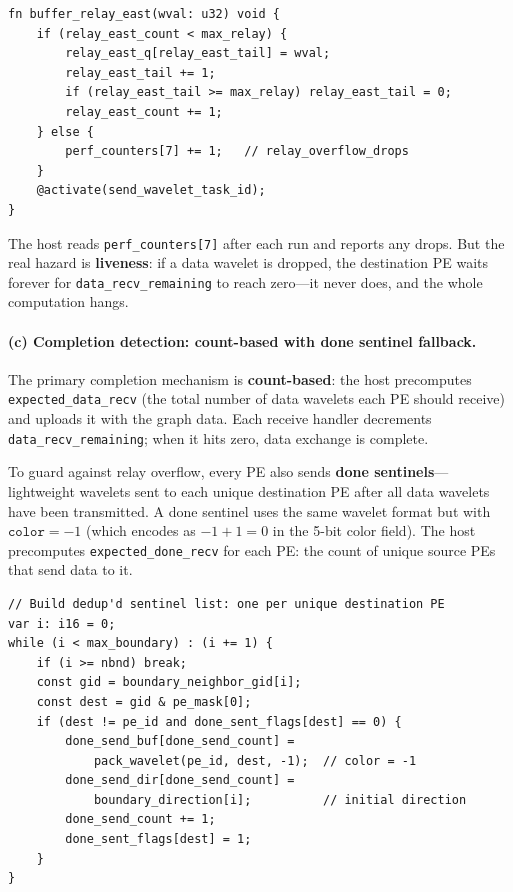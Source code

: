 \documentclass[11pt,letterpaper]{article}
\begin{document}
\begin{lstlisting}[language=CSL, numbers=none]
fn buffer_relay_east(wval: u32) void {
    if (relay_east_count < max_relay) {
        relay_east_q[relay_east_tail] = wval;
        relay_east_tail += 1;
        if (relay_east_tail >= max_relay) relay_east_tail = 0;
        relay_east_count += 1;
    } else {
        perf_counters[7] += 1;   // relay_overflow_drops
    }
    @activate(send_wavelet_task_id);
}
\end{lstlisting}

The host reads \texttt{perf\_counters[7]} after each run and reports any drops. But the real hazard is \textbf{liveness}: if a data wavelet is dropped, the destination PE waits forever for \texttt{data\_recv\_remaining} to reach zero---it never does, and the whole computation hangs.

\paragraph{(c) Completion detection: count-based with done sentinel fallback.}

The primary completion mechanism is \textbf{count-based}: the host precomputes \texttt{expected\_data\_recv} (the total number of data wavelets each PE should receive) and uploads it with the graph data. Each receive handler decrements \texttt{data\_recv\_remaining}; when it hits zero, data exchange is complete.

To guard against relay overflow, every PE also sends \textbf{done sentinels}---lightweight wavelets sent to each unique destination PE after all data wavelets have been transmitted. A done sentinel uses the same wavelet format but with $\texttt{color} = -1$ (which encodes as $-1+1=0$ in the 5-bit color field). The host precomputes \texttt{expected\_done\_recv} for each PE: the count of unique source PEs that send data to it.

\begin{lstlisting}[language=CSL, numbers=none, caption={Done sentinel construction (from \texttt{send\_boundary})}]
// Build dedup'd sentinel list: one per unique destination PE
var i: i16 = 0;
while (i < max_boundary) : (i += 1) {
    if (i >= nbnd) break;
    const gid = boundary_neighbor_gid[i];
    const dest = gid & pe_mask[0];
    if (dest != pe_id and done_sent_flags[dest] == 0) {
        done_send_buf[done_send_count] =
            pack_wavelet(pe_id, dest, -1);  // color = -1
        done_send_dir[done_send_count] =
            boundary_direction[i];          // initial direction
        done_send_count += 1;
        done_sent_flags[dest] = 1;
    }
}
\end{lstlisting}
\end{document}

